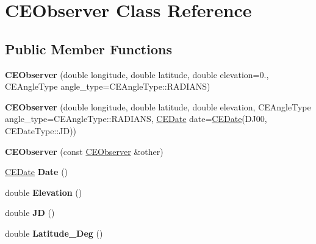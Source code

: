 \hypertarget{class_c_e_observer}{}\section{C\+E\+Observer Class Reference}
\label{class_c_e_observer}
\subsection*{Public Member Functions}
\begin{DoxyCompactItemize}
\item 
\hypertarget{class_c_e_observer_ad6e0b646e01fdddec132689723bda78c}{}{\bfseries C\+E\+Observer} (double longitude, double latitude, double elevation=0., C\+E\+Angle\+Type angle\+\_\+type=C\+E\+Angle\+Type\+::\+R\+A\+D\+I\+A\+N\+S)\label{class_c_e_observer_ad6e0b646e01fdddec132689723bda78c}

\item 
\hypertarget{class_c_e_observer_a2d89d3686c049313eb2e6dbec82a2737}{}{\bfseries C\+E\+Observer} (double longitude, double latitude, double elevation, C\+E\+Angle\+Type angle\+\_\+type=C\+E\+Angle\+Type\+::\+R\+A\+D\+I\+A\+N\+S, \hyperlink{class_c_e_date}{C\+E\+Date} date=\hyperlink{class_c_e_date}{C\+E\+Date}(D\+J00, C\+E\+Date\+Type\+::\+J\+D))\label{class_c_e_observer_a2d89d3686c049313eb2e6dbec82a2737}

\item 
\hypertarget{class_c_e_observer_abed8a7df1b32b448e723166bc5e53a64}{}{\bfseries C\+E\+Observer} (const \hyperlink{class_c_e_observer}{C\+E\+Observer} \&other)\label{class_c_e_observer_abed8a7df1b32b448e723166bc5e53a64}

\item 
\hypertarget{class_c_e_observer_a7830e2317c65937e2998b07c334f96cd}{}\hyperlink{class_c_e_date}{C\+E\+Date} {\bfseries Date} ()\label{class_c_e_observer_a7830e2317c65937e2998b07c334f96cd}

\item 
\hypertarget{class_c_e_observer_a04aa1b4f4709b9bf340fc0bd15c831c6}{}double {\bfseries Elevation} ()\label{class_c_e_observer_a04aa1b4f4709b9bf340fc0bd15c831c6}

\item 
\hypertarget{class_c_e_observer_a94ea5d05a24a1a8f96f576498c42da09}{}double {\bfseries J\+D} ()\label{class_c_e_observer_a94ea5d05a24a1a8f96f576498c42da09}

\item 
\hypertarget{class_c_e_observer_a71deb782773065b146e76f6f0d9a31e5}{}double {\bfseries Latitude\+\_\+\+Deg} ()\label{class_c_e_observer_a71deb782773065b146e76f6f0d9a31e5}


\end{DoxyCompactItemize}
